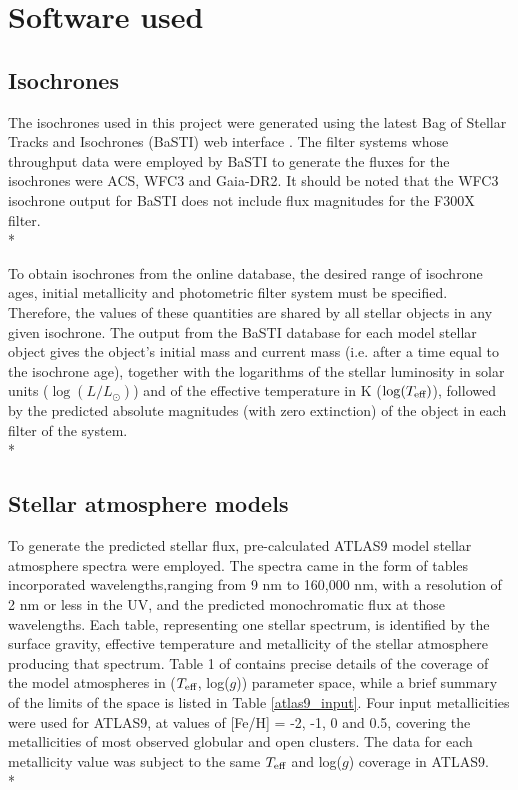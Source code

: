 \documentclass[12pt, a4paper]{report}
\begin{document}
\section{Software used}
\subsection{Isochrones}
The isochrones used in this project were generated using the latest Bag of Stellar Tracks and Isochrones (BaSTI) web interface \citep{2004ApJ...612..168P,2018ApJ...856..125H}. The filter systems whose throughput data were employed by BaSTI to generate the fluxes for the isochrones were ACS, WFC3 and Gaia-DR2. It should be noted that the WFC3 isochrone output for BaSTI does not include flux magnitudes for the F300X filter.\\*

To obtain isochrones from the online database, the desired range of isochrone ages, initial metallicity and photometric filter system must be specified. Therefore, the values of these quantities are shared by all stellar objects in any given isochrone. The output from the BaSTI database for each model stellar object gives the object's initial mass and current mass (i.e. after a time equal to the isochrone age), together with the logarithms of the stellar luminosity in solar units ($\log(L/L_{\odot})$) and of the effective temperature in K ($\log(T_{\textnormal{eff}})$), followed by the predicted absolute magnitudes (with zero extinction) of the object in each filter of the system. \\*

\subsection{Stellar atmosphere models}
To generate the predicted stellar flux, pre-calculated ATLAS9 model stellar atmosphere spectra \citep{1993KurCD..13.....K} were employed. The spectra came in the form of tables incorporated wavelengths,ranging from 9 nm to 160,000 nm, with a resolution of 2 nm or less in the UV, and the predicted monochromatic flux at those wavelengths. Each table, representing one stellar spectrum, is identified by the surface gravity, effective temperature and metallicity of the stellar atmosphere producing that spectrum. Table 1 of \cite{2004astro.ph..5087C} contains precise details of the coverage of the model atmospheres in ($T_{\textnormal{eff}}$, log($g$)) parameter space, while a brief summary  of the limits of the space is listed in Table \ref{atlas9_input}. Four input metallicities were used for ATLAS9, at values of [Fe/H] = -2, -1, 0 and 0.5, covering the metallicities of most observed globular and open clusters. The data for each metallicity value was subject to the same $T_{\textnormal{eff}}$ and log($g$) coverage in ATLAS9.\\*
\end{document}
